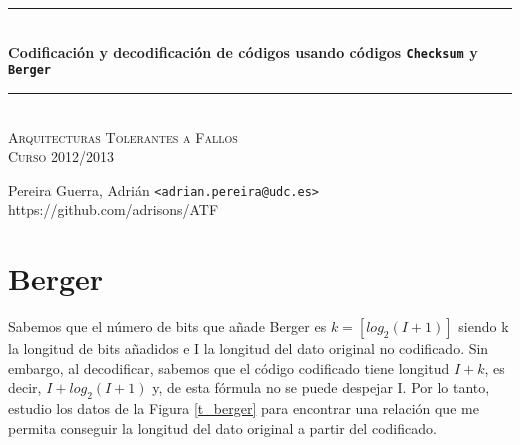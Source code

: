 \documentclass[a4paper]{article}
\newcommand{\HRule}{\rule{\linewidth}{0.5mm}}
\begin{document}
		\begin{center}

			\HRule \\[0.4cm]
			{ \huge \bfseries Codificación y decodificación de códigos usando códigos \texttt{Checksum} y \texttt{Berger}}\\[0.4cm]
			\HRule \\[0cm]

			\vspace{1cm}
			\textsc{\Large Arquitecturas Tolerantes a Fallos}\\[0.5cm]
			\textsc{\Large Curso 2012/2013}\\[0.5cm]

		\end{center}

		\begin{center}
		Pereira Guerra, Adrián \texttt{<adrian.pereira@udc.es>}\\
		https://github.com/adrisons/ATF
		\end{center}
		\vspace{2cm}




%	

\section{Berger}
	Sabemos que el número de bits que añade Berger es $k = [log_2(I+1)]$ siendo k la longitud de bits añadidos e I la longitud del dato original no codificado. Sin embargo, al decodificar, sabemos que el código codificado tiene longitud $I + k$, es decir, $I + log_2(I+1)$ y, de esta fórmula no se puede despejar I. 
	Por lo tanto, estudio los datos de la Figura \ref{t_berger} para encontrar una relación que me permita conseguir la longitud del dato original a partir del codificado.
	
\end{document}
